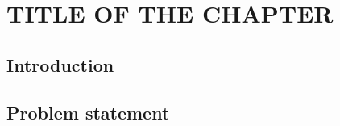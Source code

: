 %



\chapter{TITLE OF THE CHAPTER}
\label{ch:longest_consecutive_sequence}
\section*{Introduction}

\section{Problem statement}
\begin{exercise}
\label{example:longest_consecutive_sequence:exercice1}

	\begin{example}
		\label{example:longest_consecutive_sequence:example1}
		\hfill \\
	
		
	\end{example}

	\begin{example}
		\label{example:longest_consecutive_sequence:example2}
		\hfill \\
		
	\end{example}

	\begin{example}
		\hfill \\
	
	\label{ex:longest_consecutive_sequence:example3}
	\end{example}

	\begin{example}
		\hfill \\

	\label{ex:longest_consecutive_sequence:example4}	
	\end{example}
\end{exercise}


